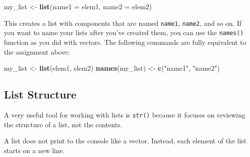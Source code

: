 \documentclass[]{book}
\newenvironment{Shaded}{\begin{snugshade}}{\end{snugshade}}
\newcommand{\CommentTok}[1]{\textcolor[rgb]{0.56,0.35,0.01}{\textit{#1}}}
\newcommand{\DataTypeTok}[1]{\textcolor[rgb]{0.13,0.29,0.53}{#1}}
\newcommand{\DecValTok}[1]{\textcolor[rgb]{0.00,0.00,0.81}{#1}}
\newcommand{\KeywordTok}[1]{\textcolor[rgb]{0.13,0.29,0.53}{\textbf{#1}}}
\newcommand{\NormalTok}[1]{#1}
\newcommand{\OperatorTok}[1]{\textcolor[rgb]{0.81,0.36,0.00}{\textbf{#1}}}
\newcommand{\StringTok}[1]{\textcolor[rgb]{0.31,0.60,0.02}{#1}}
\begin{document}
\begin{Shaded}
\begin{Highlighting}[]
\NormalTok{my_list <-}\StringTok{ }\KeywordTok{list}\NormalTok{(}\DataTypeTok{name1 =}\NormalTok{ elem1, }
                \DataTypeTok{name2 =}\NormalTok{ elem2)}
\end{Highlighting}
\end{Shaded}

This creates a list with components that are named \texttt{name1}, \texttt{name2}, and so on. If you want to name your lists after you've created them, you can use the \texttt{names()} function as you did with vectors. The following commands are fully equivalent to the assignment above:

\begin{Shaded}
\begin{Highlighting}[]
\NormalTok{my_list <-}\StringTok{ }\KeywordTok{list}\NormalTok{(elem1, elem2)}
\KeywordTok{names}\NormalTok{(my_list) <-}\StringTok{ }\KeywordTok{c}\NormalTok{(}\StringTok{"name1"}\NormalTok{, }\StringTok{"name2"}\NormalTok{)}
\end{Highlighting}
\end{Shaded}

\hypertarget{list-structure}{%
\subsection{List Structure}\label{list-structure}}

A very useful tool for working with lists is \texttt{str()} because it focuses on reviewing the structure of a list, not the contents.

\begin{Shaded}
\end{Shaded}

A list does not print to the console like a vector. Instead, each element of the list starts on a new line.
\end{document}
